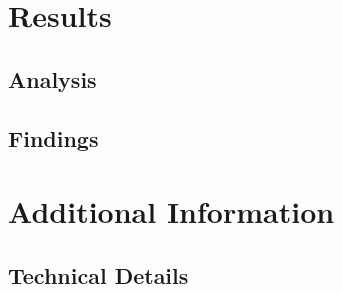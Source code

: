 \documentclass{scrreprt}
\begin{document}
\chapter{Results}
\section{Analysis}
\blindtext

\section{Findings}
\blindtext[2]

\blindtext

\appendix
\chapter{Additional Information}
\section{Technical Details}
\blindtext
\end{document}
